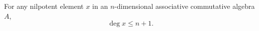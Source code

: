 For any nilpotent element $x$ in an $n$-dimensional associative commutative algebra $A$,
$$
\deg x \leq n + 1.
$$
